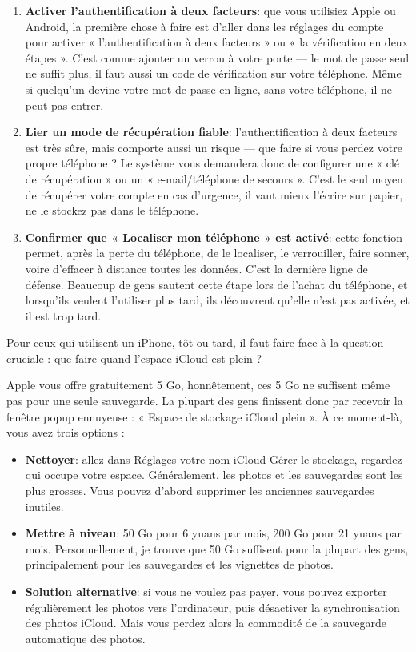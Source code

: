 \begin{enumerate}
  \item \textbf{Activer l'authentification à deux facteurs}: que vous utilisiez Apple ou Android, la première chose à faire est d'aller dans les réglages du compte pour activer « l'authentification à deux facteurs » ou « la vérification en deux étapes ». C'est comme ajouter un verrou à votre porte — le mot de passe seul ne suffit plus, il faut aussi un code de vérification sur votre téléphone. Même si quelqu'un devine votre mot de passe en ligne, sans votre téléphone, il ne peut pas entrer.
  \item \textbf{Lier un mode de récupération fiable}: l'authentification à deux facteurs est très sûre, mais comporte aussi un risque — que faire si vous perdez votre propre téléphone ? Le système vous demandera donc de configurer une « clé de récupération » ou un « e-mail/téléphone de secours ». C'est le seul moyen de récupérer votre compte en cas d'urgence, il vaut mieux l'écrire sur papier, ne le stockez pas dans le téléphone.
  \item \textbf{Confirmer que « Localiser mon téléphone » est activé}: cette fonction permet, après la perte du téléphone, de le localiser, le verrouiller, faire sonner, voire d'effacer à distance toutes les données. C'est la dernière ligne de défense. Beaucoup de gens sautent cette étape lors de l'achat du téléphone, et lorsqu'ils veulent l'utiliser plus tard, ils découvrent qu'elle n'est pas activée, et il est trop tard.
\end{enumerate}


Pour ceux qui utilisent un iPhone, tôt ou tard, il faut faire face à la question cruciale : que faire quand l'espace iCloud est plein ?

Apple vous offre gratuitement 5 Go, honnêtement, ces 5 Go ne suffisent même pas pour une seule sauvegarde. La plupart des gens finissent donc par recevoir la fenêtre popup ennuyeuse : « Espace de stockage iCloud plein ». À ce moment-là, vous avez trois options :

\begin{itemize}
  \item \textbf{Nettoyer}: allez dans Réglages votre nom iCloud Gérer le stockage, regardez qui occupe votre espace. Généralement, les photos et les sauvegardes sont les plus grosses. Vous pouvez d'abord supprimer les anciennes sauvegardes inutiles.
  \item \textbf{Mettre à niveau}: 50 Go pour 6 yuans par mois, 200 Go pour 21 yuans par mois. Personnellement, je trouve que 50 Go suffisent pour la plupart des gens, principalement pour les sauvegardes et les vignettes de photos.
  \item \textbf{Solution alternative}: si vous ne voulez pas payer, vous pouvez exporter régulièrement les photos vers l'ordinateur, puis désactiver la synchronisation des photos iCloud. Mais vous perdez alors la commodité de la sauvegarde automatique des photos.
\end{itemize}

